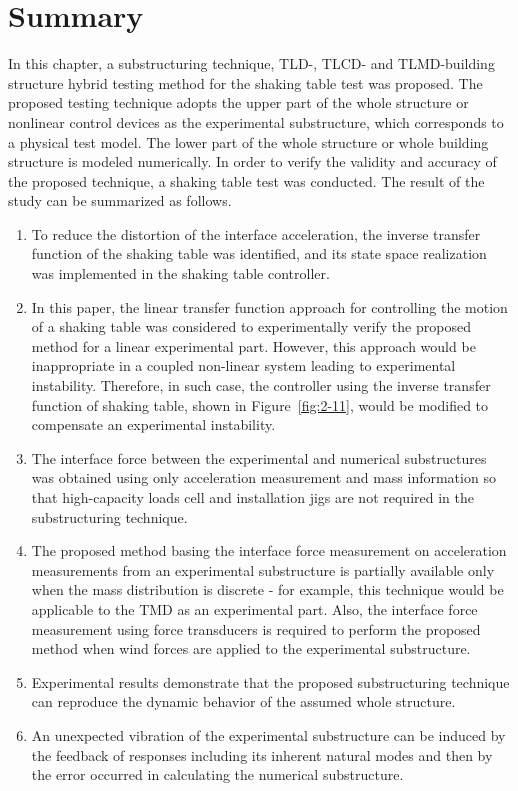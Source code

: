 \section{Summary}
In this chapter, a substructuring technique, TLD-, TLCD- and TLMD-building structure hybrid testing method for the shaking table test was proposed. The proposed testing technique adopts the upper part of the whole structure or nonlinear control devices as the experimental substructure, which corresponds to a physical test model. The lower part of the whole structure or whole building structure is modeled numerically. In order to verify the validity and accuracy of the proposed technique, a shaking table test was conducted. The result of the study can be summarized as follows.
\begin{enumerate}
\item To reduce the distortion of the interface acceleration, the inverse transfer function of the shaking table was identified, and its state space realization was implemented in the shaking table controller.
\item In this paper, the linear transfer function approach for controlling the motion of a shaking table was considered to experimentally verify the proposed method for a linear experimental part. However, this approach would be inappropriate in a coupled non-linear system leading to experimental instability. Therefore, in such case, the controller using the inverse transfer function of shaking table, shown in Figure~\ref{fig:2-11}, would be modified to compensate an experimental instability.
\item The interface force between the experimental and numerical substructures was obtained using only acceleration measurement and mass information so that high-capacity loads cell and installation jigs are not required in the substructuring technique.
\item The proposed method basing the interface force measurement on acceleration measurements from an experimental substructure is partially available only when the mass distribution is discrete - for example, this technique would be applicable to the TMD as an experimental part. Also, the interface force measurement using force transducers is required to perform the proposed method when wind forces are applied to the experimental substructure.
\item Experimental results demonstrate that the proposed substructuring technique can reproduce the dynamic behavior of the assumed whole structure.
\item An unexpected vibration of the experimental substructure can be induced by the feedback of responses including its inherent natural modes and then by the error occurred in calculating the numerical substructure.

\end{enumerate}
